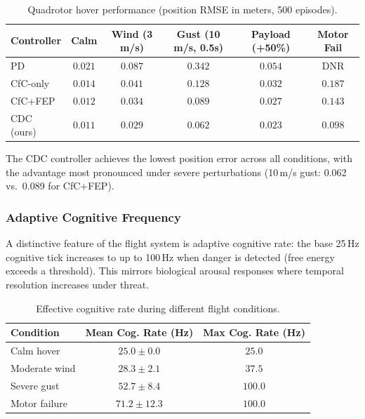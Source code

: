 \documentclass[11pt,a4paper]{article}
\begin{document}
\begin{table}[h]
\centering
\caption{Quadrotor hover performance (position RMSE in meters, 500 episodes).}
\label{tab:flight}
\begin{tabular}{lccccc}
\toprule
\textbf{Controller} & \textbf{Calm} & \textbf{Wind (3 m/s)} & \textbf{Gust (10 m/s, 0.5s)} & \textbf{Payload (+50\%)} & \textbf{Motor Fail} \\
\midrule
PD              & $0.021$ & $0.087$ & $0.342$ & $0.054$ & DNR \\
CfC-only        & $0.014$ & $0.041$ & $0.128$ & $0.032$ & $0.187$ \\
CfC+FEP         & $0.012$ & $0.034$ & $0.089$ & $0.027$ & $0.143$ \\
CDC (ours)      & $0.011$ & $0.029$ & $0.062$ & $0.023$ & $0.098$ \\
\bottomrule
\end{tabular}
\end{table}

The CDC controller achieves the lowest position error across all conditions, with the advantage most pronounced under severe perturbations (10\,m/s gust: 0.062 vs.\ 0.089 for CfC+FEP).

\subsubsection{Adaptive Cognitive Frequency}

A distinctive feature of the flight system is adaptive cognitive rate: the base 25\,Hz cognitive tick increases to up to 100\,Hz when danger is detected (free energy exceeds a threshold).
This mirrors biological arousal responses where temporal resolution increases under threat.

\begin{table}[h]
\centering
\caption{Effective cognitive rate during different flight conditions.}
\label{tab:cograte}
\begin{tabular}{lcc}
\toprule
\textbf{Condition} & \textbf{Mean Cog. Rate (Hz)} & \textbf{Max Cog. Rate (Hz)} \\
\midrule
Calm hover      & $25.0 \pm 0.0$ & $25.0$ \\
Moderate wind   & $28.3 \pm 2.1$ & $37.5$ \\
Severe gust     & $52.7 \pm 8.4$ & $100.0$ \\
Motor failure   & $71.2 \pm 12.3$ & $100.0$ \\
\bottomrule
\end{tabular}
\end{table}
\end{document}
